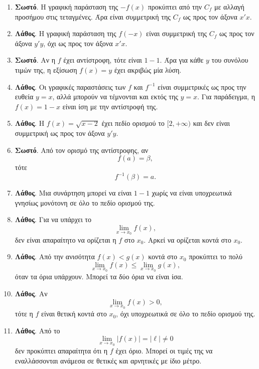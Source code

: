 \begin{enumerate}[label=\textbf{1.\arabic*.}]
\item \textbf{Σωστό}. Η γραφική παράσταση της $-f(x)$ προκύπτει από την $C_f$ με αλλαγή προσήμου στις τεταγμένες. Άρα είναι συμμετρική της $C_f$ ως προς τον άξονα $x'x$.

\item \textbf{Λάθος}. Η γραφική παράσταση της $f(-x)$ είναι συμμετρική της $C_f$ ως προς τον άξονα $y'y$, όχι ως προς τον άξονα $x'x$.

\item \textbf{Σωστό}. Αν η $f$ έχει αντίστροφη, τότε είναι $1-1$. Άρα για κάθε $y$ του συνόλου τιμών της, η εξίσωση $f(x)=y$ έχει ακριβώς μία λύση.

\item \textbf{Λάθος}. Οι γραφικές παραστάσεις των $f$ και $f^{-1}$ είναι συμμετρικές ως προς την ευθεία $y=x$, αλλά μπορούν να τέμνονται και εκτός της $y=x$. Για παράδειγμα, η $f(x)=1-x$ είναι ίση με την αντίστροφή της.

\item \textbf{Λάθος}. Η $f(x)=\sqrt{x-2}$ έχει πεδίο ορισμού το $[2,+\infty)$ και δεν είναι συμμετρική ως προς τον άξονα $y'y$.

\item \textbf{Σωστό}. Από τον ορισμό της αντίστροφης, αν
\[
f(a)=\beta,
\]
τότε
\[
f^{-1}(\beta)=a.
\]

\item \textbf{Λάθος}. Μια συνάρτηση μπορεί να είναι $1-1$ χωρίς να είναι υποχρεωτικά γνησίως μονότονη σε όλο το πεδίο ορισμού της.

\item \textbf{Λάθος}. Για να υπάρχει το
\[
\lim_{x\to x_0}f(x),
\]
δεν είναι απαραίτητο να ορίζεται η $f$ στο $x_0$. Αρκεί να ορίζεται κοντά στο $x_0$.

\item \textbf{Λάθος}. Από την ανισότητα $f(x)<g(x)$ κοντά στο $x_0$ προκύπτει το πολύ
\[
\lim_{x\to x_0}f(x)\leq\lim_{x\to x_0}g(x),
\]
όταν τα όρια υπάρχουν. Μπορεί τα δύο όρια να είναι ίσα.

\item \textbf{Λάθος}. Αν
\[
\lim_{x\to x_0}f(x)>0,
\]
τότε η $f$ είναι θετική κοντά στο $x_0$, όχι υποχρεωτικά σε όλο το πεδίο ορισμού της.

\item \textbf{Λάθος}. Από το
\[
\lim_{x\to x_0}|f(x)|=|\ell|\neq0
\]
δεν προκύπτει απαραίτητα ότι η $f$ έχει όριο. Μπορεί οι τιμές της να εναλλάσσονται ανάμεσα σε θετικές και αρνητικές με ίδιο μέτρο.


\end{enumerate}
